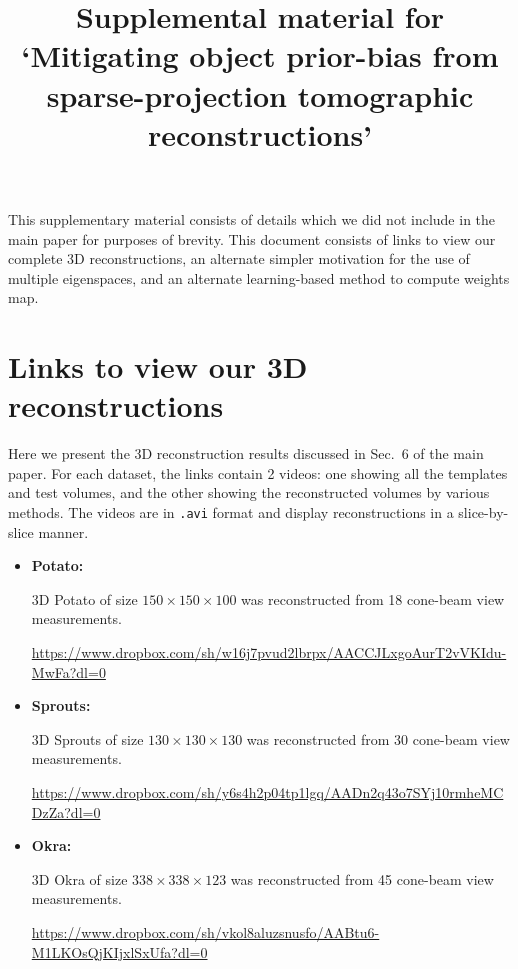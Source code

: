 \documentclass{article}
\title{Supplemental material for `Mitigating object prior-bias from sparse-projection
tomographic reconstructions'}
\begin{document}
\date{}
\maketitle
This supplementary material consists of details which we did not
include in the main paper for purposes of brevity. This document
consists of links to view our complete 3D reconstructions, an
alternate simpler motivation for the use of multiple eigenspaces, and an
alternate learning-based method to compute weights map. %

\tableofcontents


\section{Links to view our 3D reconstructions}
Here we present the 3D reconstruction results discussed in Sec.~6 of
the main paper. For each dataset, the links contain 2 videos: one
showing all the templates and test volumes, and the other showing the
reconstructed volumes by various methods. The videos are in
\verb+.avi+ format and display reconstructions in a slice-by-slice
manner.

\begin{itemize}

\item \textbf{Potato:} 

    3D Potato of size $150\times 150\times 100$ was reconstructed from 18 cone-beam view measurements.

  \url{https://www.dropbox.com/sh/w16j7pvud2lbrpx/AACCJLxgoAurT2vVKIdu-MwFa?dl=0}
\item \textbf{Sprouts:}
 
    3D Sprouts of size $130\times 130\times 130$ was reconstructed from 30 cone-beam view measurements.

    \url{https://www.dropbox.com/sh/y6s4h2p04tp1lgq/AADn2q43o7SYj10rmheMCDzZa?dl=0}
 \item \textbf{Okra:}

  3D Okra of size $338\times 338\times 123$ was reconstructed from 45 cone-beam view measurements.

  \url{https://www.dropbox.com/sh/vkol8aluzsnusfo/AABtu6-M1LKOsQjKIjxlSxUfa?dl=0}
\end{itemize}
\end{document}
